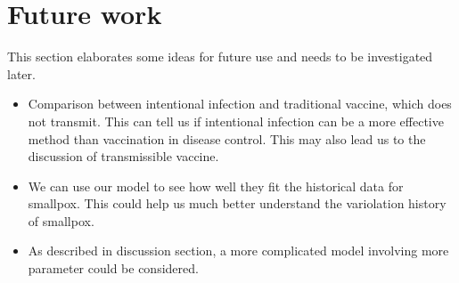\documentclass[12pt]{article}
\begin{document}
\section{Future work}
This section elaborates some ideas for future use and needs to be investigated later.
\begin{itemize}
\item Comparison between intentional infection and traditional vaccine, which does not transmit. This can tell us if intentional infection can be a more effective method than vaccination in disease control. This may also lead us to the discussion of transmissible vaccine.
\item We can use our model to see how well they fit the historical data for smallpox. This could help us much better understand the variolation history of smallpox.
\item As described in discussion section, a more complicated model involving more parameter could be considered.
\end{itemize}

\printbibliography
\end{document}

